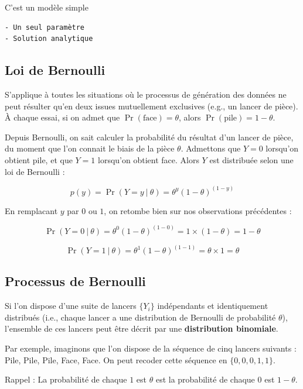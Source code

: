 \documentclass[
  a4paper,11pt,twoside,onecolumn,openright,final,oldfontcommands]{memoir}
\theoremstyle{definition}
\theoremstyle{definition}
\theoremstyle{definition}
\theoremstyle{remark}
\begin{document}
C'est un modèle simple

\begin{verbatim}
- Un seul paramètre
- Solution analytique
\end{verbatim}

\hypertarget{loi-de-bernoulli}{%
\subsection{Loi de Bernoulli}\label{loi-de-bernoulli}}

S'applique à toutes les situations où le processus de génération des données ne peut résulter qu'en deux issues mutuellement exclusives (e.g., un lancer de pièce). À chaque essai, si on admet que \(\Pr(\text{face}) = \theta\), alors \(\Pr(\text{pile}) = 1 - \theta\).

Depuis Bernoulli, on sait calculer la probabilité du résultat d'un lancer de pièce, du moment que l'on connait le biais de la pièce \(\theta\). Admettons que \(Y = 0\) lorsqu'on obtient pile, et que \(Y = 1\) lorsqu'on obtient face. Alors \(Y\) est distribuée selon une loi de Bernoulli :

\[p(y) = \Pr(Y = y \ | \ \theta) = \theta^{y} (1 - \theta)^{(1 - y)}\]

En remplacant \(y\) par \(0\) ou \(1\), on retombe bien sur nos observations précédentes :

\[\Pr(Y = 0 \ | \ \theta) = \theta^{0} (1 - \theta)^{(1 - 0)} = 1 \times (1 - \theta) = 1 - \theta\]

\[\Pr(Y = 1 \ | \ \theta) = \theta^{1} (1 - \theta)^{(1 - 1)} = \theta \times 1 = \theta\]

\hypertarget{processus-de-bernoulli}{%
\subsection{Processus de Bernoulli}\label{processus-de-bernoulli}}

Si l'on dispose d'une suite de lancers \(\{Y_i\}\) indépendants et identiquement distribués (i.e., chaque lancer a une distribution de Bernoulli de probabilité \(\theta\)), l'ensemble de ces lancers peut être décrit par une \textbf{distribution binomiale}.

Par exemple, imaginons que l'on dispose de la séquence de cinq lancers suivants : Pile, Pile, Pile, Face, Face. On peut recoder cette séquence en \(\{0, 0, 0, 1, 1\}\).

Rappel : La probabilité de chaque \(1\) est \(\theta\) est la probabilité de chaque \(0\) est \(1 - \theta\).
\end{document}
